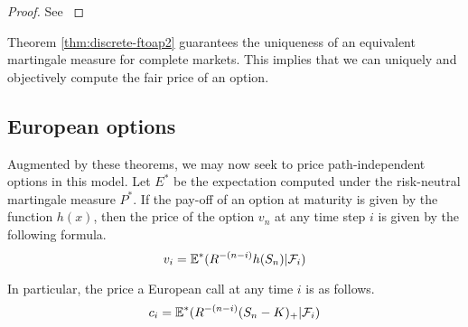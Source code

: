 \begin{proof}
	See \cite[page 9, Theorem 1.3.4]{Lamberton1996}
\end{proof}

Theorem \ref{thm:discrete-ftoap2} guarantees the uniqueness of an equivalent martingale measure for complete markets. This implies that we can uniquely and objectively compute the fair price of an option.



\subsection{European options}

Augmented by these theorems, we may now seek to price path-independent options in this model. Let $ E^* $ be the expectation computed under the risk-neutral martingale measure $ P^* $. If the pay-off of an option at maturity is given by the function $ h(x) $, then the price of the option $ v_n $ at any time step $ i $ is given by the following formula.
\begin{equation}
	\label{eq:discrete-crr-eu-pr}
	v_i = \operatorname{\mathbb{E}}^*( R^{-(n - i)} h(S_n) | \mathcal{F}_i )
\end{equation}

In particular, the price a European call at any time $ i $ is as follows.
\begin{equation}
	\label{eq:discrete-crr-eu-call-pr}
	c_i = \operatorname{\mathbb{E}}^*( R^{-(n - i)} (S_n - K)_+ | \mathcal{F}_i )
\end{equation}


